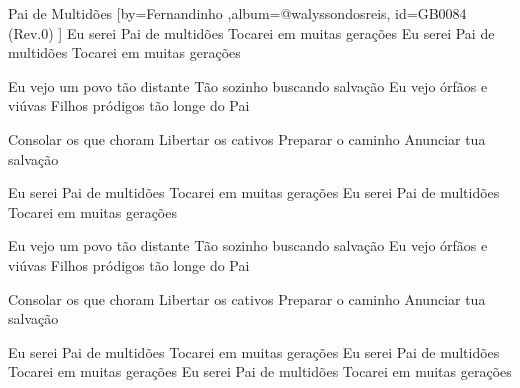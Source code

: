 \beginsong
{Pai de Multidões %
}[by={Fernandinho %
},album={@walyssondosreis},
id={GB0084 %
(Rev.0) %
}]
Eu serei Pai de multidões
Tocarei em muitas gerações
Eu serei Pai de multidões
Tocarei em muitas gerações

Eu vejo um povo tão distante
Tão sozinho buscando salvação
Eu vejo órfãos e viúvas
Filhos pródigos tão longe do Pai

Consolar os que choram
Libertar os cativos
Preparar o caminho
Anunciar tua salvação

Eu serei Pai de multidões
Tocarei em muitas gerações
Eu serei Pai de multidões
Tocarei em muitas gerações

Eu vejo um povo tão distante
Tão sozinho buscando salvação
Eu vejo órfãos e viúvas
Filhos pródigos tão longe do Pai

Consolar os que choram
Libertar os cativos
Preparar o caminho
Anunciar tua salvação

Eu serei Pai de multidões
Tocarei em muitas gerações
Eu serei Pai de multidões
Tocarei em muitas gerações
Eu serei Pai de multidões
Tocarei em muitas gerações


